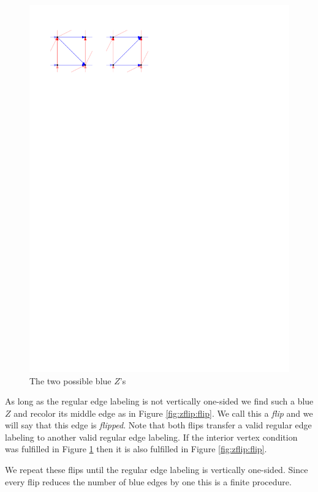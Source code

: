   \begin{figure}[h]
    \centering
    \includegraphics[scale=1]{unifiedAlgo/img/zflip/blueZ.pdf}
    \caption{The two possible blue $Z$'s}
    \label{fig:zflip:blueZ}
  \end{figure}

  As long as the regular edge labeling is not vertically one-sided we find such a blue $Z$ and recolor its middle edge as in Figure \ref{fig:zflip:flip}. We call this a \emph{flip} and we will say that this edge is \emph{flipped}.
  Note that both flips transfer a valid regular edge labeling to another valid regular edge labeling. If the interior vertex condition was fulfilled in Figure \ref{fig:zflip:blueZ} then it is also fulfilled in Figure \ref{fig:zflip:flip}.

   We repeat these flips until the regular edge labeling is vertically one-sided.
   Since every flip reduces the number of blue edges by one this is a finite procedure.

